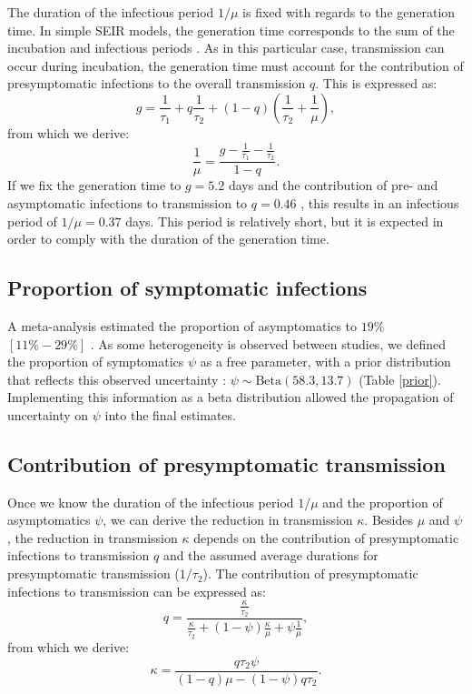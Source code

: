 \documentclass{article}
\begin{document}
		The duration of the infectious period $1/\mu$ is fixed with regards to the generation time.
		In simple SEIR models, the generation time corresponds to the sum of the incubation and infectious periods \cite{anderson1992infectious,svensson2007note}.
		As in this particular case, transmission can occur during incubation, the generation time must account for the contribution of presymptomatic infections to the overall transmission $q$.
		This is expressed as:
		\begin{equation}
		g = \frac{1}{\tau_1} + q \frac{1}{\tau_2} + (1-q)\left(\frac{1}{\tau_2}+\frac{1}{\mu}\right),
		\end{equation}
		from which we derive:
		\begin{equation}
		\frac{1}{\mu} = \frac{g-\frac{1}{\tau_1}-\frac{1}{\tau_2}}{1-q}.\label{eq:mu}
		\end{equation}
		If we fix the generation time to $g=5.2$ days \cite{ganyani2020estimating,he2020temporal} and the contribution of pre- and asymptomatic infections to transmission to $q=0.46$ \cite{ganyani2020estimating,liu2020,he2020temporal}, this results in an infectious period of $1/\mu=0.37$ days. 
		This period is relatively short, but it is expected in order to comply with the duration of the generation time.
		
\subsection{Proportion of symptomatic infections}
\label{sec:psi}
A meta-analysis estimated the proportion of asymptomatics to $19\%$ $[11\% - 29\%]$ \cite{buitrago2020role}. As some heterogeneity is observed between studies, we defined the proportion of symptomatics $\psi$ as a free parameter, with a prior distribution that reflects this observed uncertainty : $\psi \sim \text{Beta}(58.3,13.7)$ (Table \ref{prior}). Implementing this information as a beta distribution allowed the propagation of uncertainty on $\psi$ into the final estimates.

\subsection{Contribution of presymptomatic transmission}

Once we know the duration of the infectious period $1/\mu$ and the proportion of asymptomatics $\psi$, we can derive the reduction in transmission $\kappa$. Besides $\mu$ and $\psi$, the reduction in transmission  $\kappa$ depends on the contribution of presymptomatic infections to transmission $q$ and the assumed average durations for presymptomatic transmission ($1/\tau_2$).
The contribution of presymptomatic infections to transmission can be expressed as:
		\begin{equation}
		q = \frac{\frac{\kappa}{\tau_2}}{\frac{\kappa}{\tau_2} + (1-\psi)\frac{\kappa}{\mu} + \psi\frac{1}{\mu}},
		\end{equation}	
from which we derive:
		\begin{equation}
		\kappa = \frac{q\tau_2\psi}{(1-q)\mu-(1-\psi)q \tau_2}.
		\label{eq:kappa}
		\end{equation}
		
\end{document}
